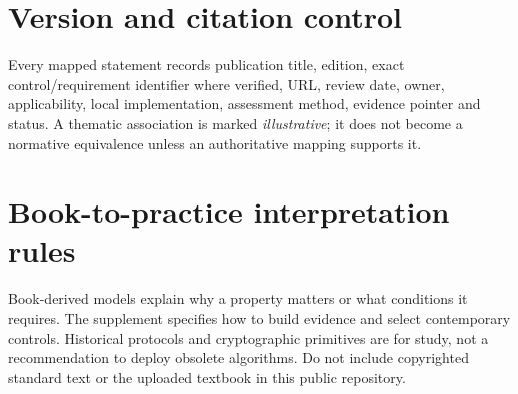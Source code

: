 \documentclass[10pt,letterpaper]{article}
\begin{document}
\section{Version and citation control}
Every mapped statement records publication title, edition, exact control/requirement identifier where verified, URL, review date, owner, applicability, local implementation, assessment method, evidence pointer and status. A thematic association is marked \emph{illustrative}; it does not become a normative equivalence unless an authoritative mapping supports it.
\section{Book-to-practice interpretation rules}
Book-derived models explain why a property matters or what conditions it requires. The supplement specifies how to build evidence and select contemporary controls. Historical protocols and cryptographic primitives are for study, not a recommendation to deploy obsolete algorithms. Do not include copyrighted standard text or the uploaded textbook in this public repository.
\end{document}
